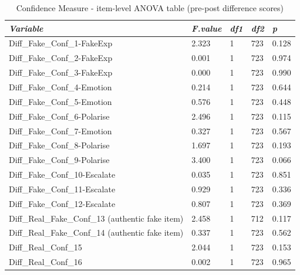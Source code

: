 \documentclass[empirical, authordate]{jote-new-article}
\begin{document}
\begin{table}

  \caption{Confidence Measure - item-level ANOVA table (pre-post difference scores)}
  \label{tab:tableS27}


  \begin{tabularx}{\linewidth}{@{} X  l  l  l  l@{}}

    \toprule
    \emph{Variable}                                  & \emph{F.value} & \emph{df1} & \emph{df2} & \emph{p} \\
    \midrule
    Diff\_Fake\_Conf\_1-FakeExp                      & 2.323          & 1          & 723        & 0.128    \\
    Diff\_Fake\_Conf\_2-FakeExp                      & 0.001          & 1          & 723        & 0.974    \\
    Diff\_Fake\_Conf\_3-FakeExp                      & 0.000          & 1          & 723        & 0.990    \\
    Diff\_Fake\_Conf\_4-Emotion                      & 0.214          & 1          & 723        & 0.644    \\
    Diff\_Fake\_Conf\_5-Emotion                      & 0.576          & 1          & 723        & 0.448    \\
    Diff\_Fake\_Conf\_6-Polarise                     & 2.496          & 1          & 723        & 0.115    \\
    Diff\_Fake\_Conf\_7-Emotion                      & 0.327          & 1          & 723        & 0.567    \\
    Diff\_Fake\_Conf\_8-Polarise                     & 1.697          & 1          & 723        & 0.193    \\
    Diff\_Fake\_Conf\_9-Polarise                     & 3.400          & 1          & 723        & 0.066    \\
    Diff\_Fake\_Conf\_10-Escalate                    & 0.035          & 1          & 723        & 0.851    \\
    Diff\_Fake\_Conf\_11-Escalate                    & 0.929          & 1          & 723        & 0.336    \\
    Diff\_Fake\_Conf\_12-Escalate                    & 0.807          & 1          & 723        & 0.369    \\
    Diff\_Real\_Fake\_Conf\_13 (authentic fake item) & 2.458          & 1          & 712        & 0.117    \\
    Diff\_Real\_Fake\_Conf\_14 (authentic fake item) & 0.337          & 1          & 723        & 0.562    \\
    Diff\_Real\_Conf\_15                             & 2.044          & 1          & 723        & 0.153    \\
    Diff\_Real\_Conf\_16                             & 0.002          & 1          & 723        & 0.965    \\
    \bottomrule
  \end{tabularx}


\end{table}
\end{document}
